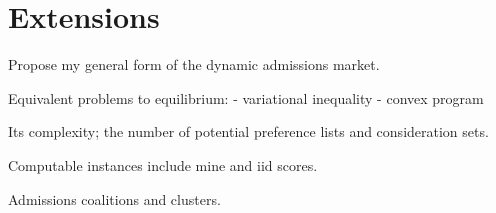 \documentclass[12pt]{article}
\theoremstyle{definition}
\begin{document}
\section{Extensions}
Propose my general form of the dynamic admissions market.

Equivalent problems to equilibrium:
- variational inequality
- convex program

Its complexity; the number of potential preference lists and consideration sets.

Computable instances include mine and iid scores.

Admissions coalitions and clusters. 
\pagebreak
\printbibliography
\end{document}
